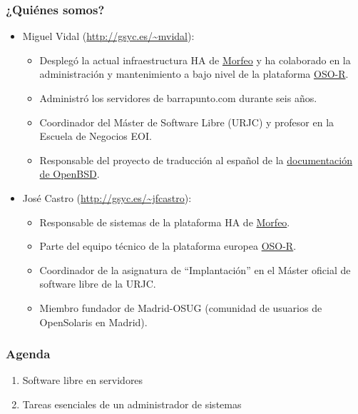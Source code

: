 \documentclass{beamer}
\begin{document}
\begin{frame}
\frametitle{¿Quiénes somos?}

\begin{itemize}
\item \alert{Miguel Vidal} (\url{http://gsyc.es/~mvidal}): 


	\begin{itemize}

\footnotesize

	\item Desplegó la actual infraestructura HA de \href{http://www.morfeo-project.org}{Morfeo} y ha colaborado en la administración y mantenimiento a bajo nivel de la plataforma \href{http://www.osor.eu}{OSO-R}. 
	\item Administró los servidores de barrapunto.com durante seis años.
	\item Coordinador del Máster de Software Libre (URJC) y profesor en la Escuela de Negocios EOI.
	\item Responsable del proyecto de traducción al español de la \href{http://www.openbsd.org/translation.html\#WHO}{documentación de OpenBSD}.
	\end{itemize}

\normalsize

\item \alert{José Castro} (\url{http://gsyc.es/~jfcastro}): 

	\begin{itemize}

\footnotesize

	\item Responsable de sistemas de la plataforma HA de \href{http://www.morfeo-project.org}{Morfeo}. 
	\item Parte del equipo técnico de la plataforma europea \href{http://www.osor.eu}{OSO-R}.
	\item Coordinador de la asignatura de ``Implantación'' en el Máster oficial de software libre de la URJC.
	\item Miembro fundador de Madrid-OSUG (comunidad de usuarios de OpenSolaris en Madrid).
	\end{itemize}

\end{itemize}
\end{frame}

\normalsize

\begin{frame}
  \frametitle{Agenda}

\begin{enumerate}
\item Software libre en servidores
\item Tareas esenciales de un administrador de sistemas
\end{enumerate}

\end{frame}
\end{document}
